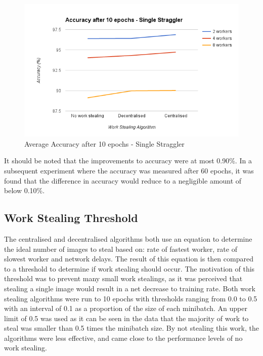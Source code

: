\documentclass[12pt]{article}
\begin{document}
\begin{figure}[H]
  \centering
  \includegraphics[width=6in]{AccuracySingle}
  \caption[]{Average Accuracy after 10 epochs - Single Straggler}
  \label{AccuracySingle}
\end{figure}

It should be noted that the improvements to accuracy were at most 0.90\%. In a subsequent experiment where the accuracy was measured after 60 epochs, it was found that the difference in accuracy would reduce to a negligible amount of below 0.10\%.

\subsection{Work Stealing Threshold}
The centralised and decentralised algorithms both use an equation to determine the ideal number of images to steal based on: rate of fastest worker, rate of slowest worker and network delays. The result of this equation is then compared to a threshold to determine if work stealing should occur. The motivation of this threshold was to prevent many small work stealings, as it was perceived that stealing a single image would result in a net decrease to training rate.
\newline
\newline
Both work stealing algorithms were run to 10 epochs with thresholds ranging from 0.0 to 0.5 with an interval of 0.1 as a proportion of the size of each minibatch. An upper limit of 0.5 was used as it can be seen in the data that the majority of work to steal was smaller than 0.5 times the minibatch size. By not stealing this work, the algorithms were less effective, and came close to the performance levels of no work stealing.
\end{document}

